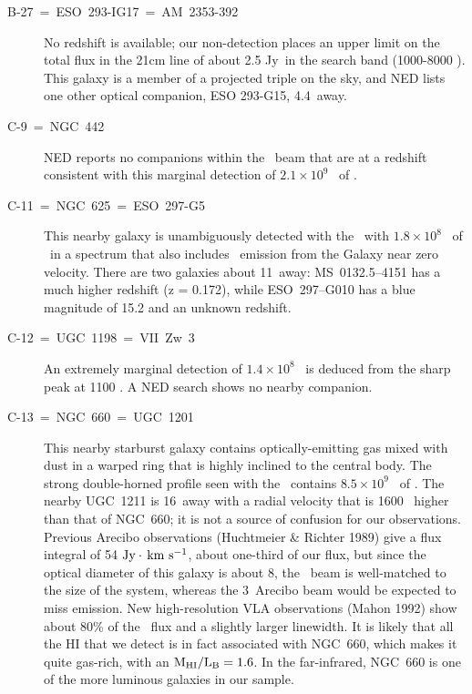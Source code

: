 \begin{description}
\item[B-27~=~ESO~293-IG17~=~AM~2353-392] 
No redshift is available; our non-detection places an 
upper limit on the total flux in the 21cm line of about 2.5 Jy\CDOT\KMS\ 
in the search band (1000-8000 \KMS).  This galaxy is a member of a projected  
triple on the sky, and NED lists one other optical companion, ESO 293-G15, 
4.4\AMIN\ away. 

\item[C-9~=~NGC~442] 
NED reports no companions within the \ beam that are at a 
redshift consistent with this marginal detection of 
$2.1 \times 10^9$ \MSUN\ of \HI.

\item[C-11~=~NGC~625~=~ESO~297-G5] 
This nearby galaxy is unambiguously detected with the \ with $1.8 \times
10^8$ \MSUN\ of \HI\ in a spectrum that also includes \HI\ emission from the 
Galaxy near zero velocity.  There are two galaxies about 11\AMIN\ away:  
MS~0132.5--4151 has a much higher redshift (z = 0.172), while ESO~297--G010 
has a blue magnitude of 15.2 and an unknown redshift.

\item[C-12~=~UGC~1198~=~VII~Zw~3] 
An extremely marginal detection of $1.4\times 10^8$ \MSUN\ is deduced from the 
sharp peak at 1100 \KMS.  A NED search shows no nearby companion.

\item[C-13~=~NGC~660~=~UGC~1201] 
This nearby starburst galaxy 
contains optically-emitting gas mixed with dust in a warped ring that is
highly inclined to the central body. 
The strong double-horned profile seen with the \ contains 
$8.5 \times 10^9$ \MSUN\ of \HI.   
The nearby UGC~1211 is 16\AMIN\ away with a radial velocity %
that is 1600 \KMS\ higher than that of NGC~660; it is not a 
source of confusion for our observations.  
Previous Arecibo observations (\cf Huchtmeier \& Richter 1989) give a flux
integral of 54 $\rm Jy \cdot {\,km\ s^{-1}}$, about one-third of our flux, but since the
optical diameter of this galaxy is about 8\AMIN, the \GB140\ beam is 
well-matched to the size of the system, whereas the 3\AMIN\ 
Arecibo beam would be expected to miss emission.  
New high-resolution VLA observations (Mahon 1992)
show about 80\% of the \GB140\ flux and a slightly 
larger linewidth.  It is likely that all the HI that we detect is in 
fact associated with NGC~660, which makes it quite gas-rich, with an $\rm
M_{\rm HI}/L_{\rm B} = 1.6$.  In the far-infrared, NGC~660 is one of
the more luminous galaxies in our sample. 


\end{description}
